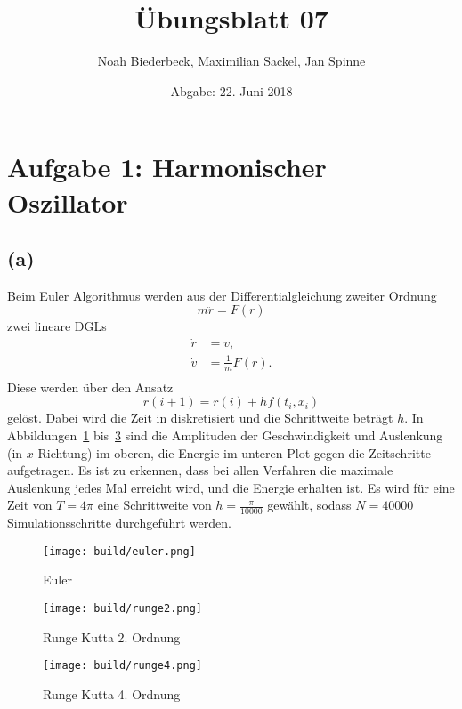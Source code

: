 \documentclass{scrartcl}
\title{Übungsblatt 07}
\author{%
  Noah Biederbeck, Maximilian Sackel, Jan Spinne
}
\date{Abgabe: 22. Juni 2018}
\begin{document}
\maketitle
\section*{Aufgabe 1: Harmonischer Oszillator}
\subsection*{(a)}
Beim Euler Algorithmus werden aus der Differentialgleichung zweiter Ordnung
\begin{equation}
  m \ddot{r} = F(r)
\end{equation}
zwei lineare DGLs
\begin{eqnarray}
  \dot{r} &= v,  \\
  \dot{v} &= \frac{1}{m} F(r). \\
\end{eqnarray}
Diese werden über den Ansatz
\begin{equation}
  r(i+1) = r(i) + h f(t_i, x_i)
\end{equation}
gelöst. Dabei wird die Zeit in diskretisiert und die Schrittweite
beträgt $h$.
In Abbildungen~\ref{fig:euler} bis~\ref{fig:rk4}
sind die Amplituden der Geschwindigkeit und Auslenkung (in $x$-Richtung) im oberen, die Energie im unteren Plot gegen die Zeitschritte aufgetragen.
Es ist zu erkennen, dass bei allen Verfahren die maximale Auslenkung jedes Mal erreicht wird, und
die Energie erhalten ist.
Es wird für eine Zeit von $T = 4\pi$ eine Schrittweite von $h = \frac{\pi}{10000}$ gewählt,
sodass $N = 40000$ Simulationsschritte durchgeführt werden.
\begin{figure}[ht]
  \centering
  \texttt{[image: build/euler.png]}
  \caption{Euler}%
  \label{fig:euler}
\end{figure}
\begin{figure}[ht]
  \centering
  \texttt{[image: build/runge2.png]}
  \caption{Runge Kutta 2. Ordnung}%
  \label{fig:rk2}
\end{figure}
\begin{figure}[ht]
  \centering
  \texttt{[image: build/runge4.png]}
  \caption{Runge Kutta 4. Ordnung}%
  \label{fig:rk4}
\end{figure}
\end{document}
